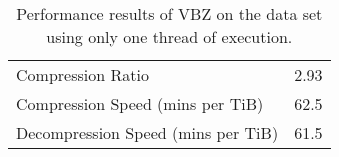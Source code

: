 \begin{table}
    \caption{\label{tab:vbz} Performance results of VBZ on the data set using only one thread of execution.}
	\begin{tabular}{|l|l|}
        \hline
Compression Ratio & 2.93\\
		Compression Speed (mins per TiB) & 62.5\\

		Decompression Speed (mins per TiB) & 61.5\\
	\hline
    \end{tabular}
\end{table}

